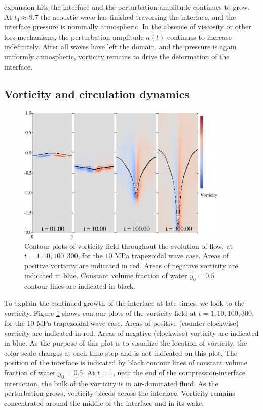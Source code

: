 expansion hits the interface and the perturbation amplitude continues
to grow. At $t_4\approx9.7$ the acoustic wave has finished traversing
the interface, and the interface pressure is nominally atmospheric. In
the absence of viscosity or other loss mechanisms, the perturbation
amplitude $a(t)$ continues to increase indefinitely. After all waves
have left the domain, and the pressure is again uniformly atmospheric,
vorticity remains to drive the deformation of the interface.
% 
% 
\subsection{Vorticity and circulation dynamics}
\begin{figure}[h] 
  \centering
  \includegraphics[width=0.9\textwidth]{./figs/lung_figs/snapshots_vorticity_t1}
  \caption[The evolution of the vorticity] {Contour plots of vorticity
    field throughout the evolution of flow, at
    $t=1, 10, 100, 300$, for the $10$ MPa trapezoidal wave case. Areas
    of positive vorticity are indicated in red. Areas of negative
    vorticity are indicated in blue. Constant volume fraction of 
    water $y_0=0.5$ contour lines are indicated in black.}
  \label{fig:vorticity_snapshots}
\end{figure}
% 
To explain the continued growth of the interface at late times, we
look to the vorticity. Figure \ref{fig:vorticity_snapshots} shows
contour plots of the vorticity field at $t=1, 10, 100, 300$, for the
$10$ MPa trapezoidal wave case. Areas of positive (counter-clockwise)
vorticity are indicated in red. Areas of negative (clockwise)
vorticity are indicated in blue. As the purpose of this plot is to
visualize the location of vorticity, the color scale changes at each
time step and is not indicated on this plot. The position of the
interface is indicated by black contour lines of constant volume
fraction of water $y_0=0.5$. At $t=1$, near the end of the
compression-interface interaction, the bulk of the vorticity is in
air-dominated fluid. As the perturbation grows, vorticity bleeds
across the interface. Vorticity remains concentrated around the middle
of the interface and in its wake.


